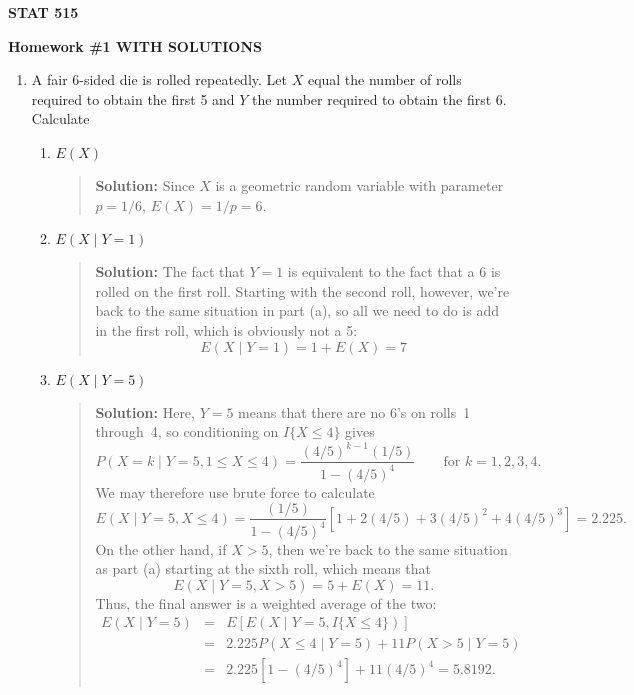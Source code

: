 \documentclass{article}
\begin{document}
\begin{center}
{\bf STAT 515}

{\bf Homework \#1 WITH SOLUTIONS}
\end{center}

\begin{enumerate}

  \item A fair 6-sided die is rolled repeatedly. Let $X$ equal the number of
  rolls required to obtain the first 5 and $Y$ the number required to obtain the
  first 6. Calculate

  \begin{enumerate}

  \item $E(X)$  
    \begin{quotation} {\bf Solution:}
Since $X$ is a geometric random variable with parameter $p=1/6$, $E(X)=1/p=6$.  
    \end{quotation}

  \item $E(X \mid Y=1)$
    \begin{quotation} {\bf Solution:}  The fact that $Y=1$ is equivalent to the fact that
    a 6 is rolled on the first roll.  Starting with the second roll, however, we're back to the
    same situation in part (a), so all we need to do is add in the first roll, which is obviously
    not a 5:
    \[
    E(X \mid Y=1) = 1 + E(X) = 7
    \]
    \end{quotation}

  \item $E(X \mid Y=5)$
    \begin{quotation} {\bf Solution:}
    Here, $Y=5$ means that there are no 6's on rolls~1 through~4, so conditioning
    on $I\{ X\le 4\}$ gives
    \[
    P(X = k \mid Y=5, 1\le X\le 4) = 
    \frac{(4/5)^{k-1}(1/5)}{1-(4/5)^4} \qquad \mbox{for $k=1, 2, 3, 4$.}
    \]
    We may therefore use brute force to calculate 
    \[
    E(X\mid Y=5, X\le 4) = \frac{(1/5)}{1-(4/5)^4} \left[ 1 + 2(4/5) + 3(4/5)^2 + 4(4/5)^3 \right] = 2.225.
    \]
    On the other hand, if $X>5$, then we're back to the same situation as part (a) starting
    at the sixth roll, which means that 
    \[
    E(X \mid Y=5, X>5) = 5+E(X) = 11.
    \]
    Thus, the final answer is a weighted average of the two:
    \begin{eqnarray*}
    E(X \mid Y=5) 
    &=& E \left[ E(X \mid Y=5, I\{X\le 4\}) \right] \\
    &=& 2.225 P(X \le 4 \mid Y=5) + 11P(X>5\mid Y=5) \\
    &=& 2.225 [1-(4/5)^4] + 11(4/5)^4 = 5.8192.
    \end{eqnarray*}
    \end{quotation}


\end{enumerate}
\end{enumerate}
\end{document}
